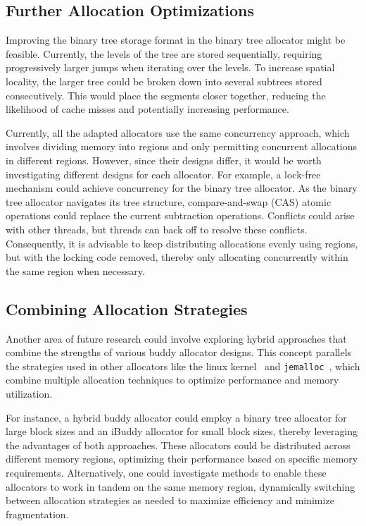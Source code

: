 \newpage
\subsection{Further Allocation Optimizations} \label{sec:futureworkOptimizations}
Improving the binary tree storage format in the binary tree allocator might be feasible. Currently, the levels of the tree are stored sequentially, requiring progressively larger jumps when iterating over the levels. To increase spatial locality, the larger tree could be broken down into several subtrees stored consecutively. This would place the segments closer together, reducing the likelihood of cache misses and potentially increasing performance.

Currently, all the adapted allocators use the same concurrency approach, which involves dividing memory into regions and only permitting concurrent allocations in different regions. However, since their designs differ, it would be worth investigating different designs for each allocator. For example, a lock-free mechanism could achieve concurrency for the binary tree allocator. As the binary tree allocator navigates its tree structure, compare-and-swap (CAS) atomic operations could replace the current subtraction operations. Conflicts could arise with other threads, but threads can back off to resolve these conflicts. Consequently, it is advisable to keep distributing allocations evenly using regions, but with the locking code removed, thereby only allocating concurrently within the same region when necessary.

% 

\subsection{Combining Allocation Strategies} \label{sec:futureworkCombine}
Another area of future research could involve exploring hybrid approaches that combine the strengths of various buddy allocator designs. This concept parallels the strategies used in other allocators like the linux kernel~\cite{linuxbuddy} and \texttt{jemalloc}~\cite{jemalloc}, which combine multiple allocation techniques to optimize performance and memory utilization.

For instance, a hybrid buddy allocator could employ a binary tree allocator for large block sizes and an iBuddy allocator for small block sizes, thereby leveraging the advantages of both approaches. These allocators could be distributed across different memory regions, optimizing their performance based on specific memory requirements. Alternatively, one could investigate methods to enable these allocators to work in tandem on the same memory region, dynamically switching between allocation strategies as needed to maximize efficiency and minimize fragmentation.
